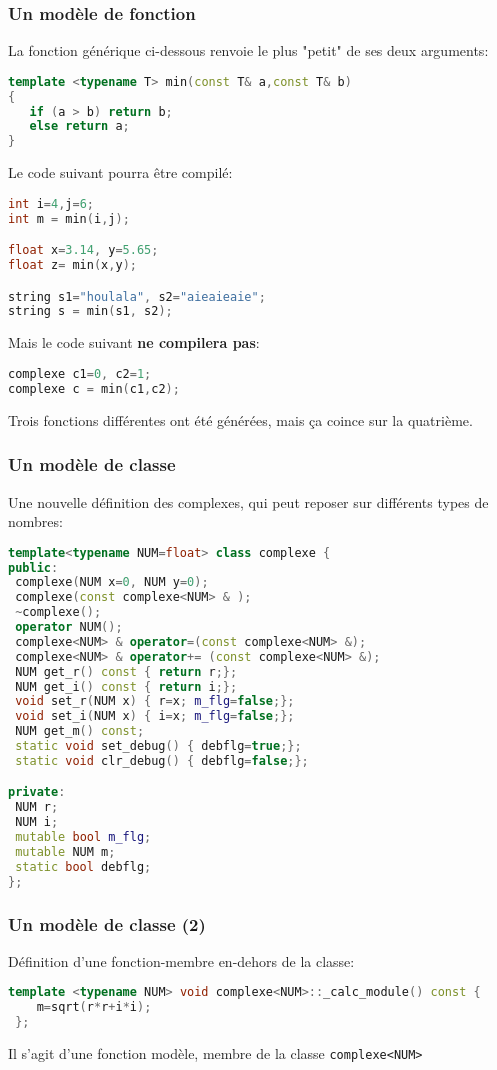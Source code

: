 \documentclass{beamer}
\begin{document}
\begin{frame}[fragile=singleslide,shrink=20]
\frametitle {Un modèle de fonction}

La fonction générique ci-dessous renvoie le plus "petit" de ses deux arguments:
\begin{lstlisting}[language=c++]
template <typename T> min(const T& a,const T& b)
{
   if (a > b) return b;
   else return a;
}
\end{lstlisting}

Le code suivant pourra être compilé:
\begin{lstlisting}[language=c++]
int i=4,j=6;
int m = min(i,j);

float x=3.14, y=5.65;
float z= min(x,y);

string s1="houlala", s2="aieaieaie";
string s = min(s1, s2);
\end{lstlisting}

Mais le code suivant \textbf{ne compilera pas}:
\begin{lstlisting}[language=c++]
complexe c1=0, c2=1;
complexe c = min(c1,c2);
\end{lstlisting}

Trois fonctions différentes ont été générées, mais ça coince sur la quatrième.
\end{frame}

\begin{frame}[fragile=singleslide,shrink=20]
\frametitle {Un modèle de classe}

Une nouvelle définition des complexes, qui peut reposer sur différents types de nombres:
\begin{lstlisting}[language=c++]
template<typename NUM=float> class complexe {
public:
 complexe(NUM x=0, NUM y=0);
 complexe(const complexe<NUM> & );
 ~complexe();
 operator NUM();
 complexe<NUM> & operator=(const complexe<NUM> &);
 complexe<NUM> & operator+= (const complexe<NUM> &);
 NUM get_r() const { return r;};
 NUM get_i() const { return i;};
 void set_r(NUM x) { r=x; m_flg=false;};
 void set_i(NUM x) { i=x; m_flg=false;};
 NUM get_m() const;
 static void set_debug() { debflg=true;};
 static void clr_debug() { debflg=false;};

private:
 NUM r;
 NUM i;
 mutable bool m_flg;
 mutable NUM m;
 static bool debflg;
};
\end{lstlisting}
\end{frame}

\begin{frame}[fragile=singleslide,shrink=20]
\frametitle {Un modèle de classe (2)}

Définition d'une fonction-membre en-dehors de la classe:
\begin{lstlisting}[language=c++]
 template <typename NUM> void complexe<NUM>::_calc_module() const {
    m=sqrt(r*r+i*i);
 };
\end{lstlisting}
Il s'agit d'une fonction modèle, membre de la classe \texttt{complexe<NUM>}
\end{frame}
\end{document}
